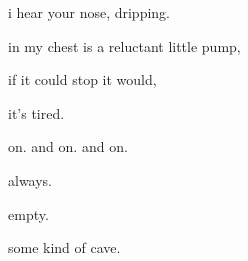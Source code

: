 \documentclass[extrafontsizes, 48pt]{memoir}
\newcommand\blankpage{%
    \null
    \thispagestyle{empty}%
    \addtocounter{page}{-1}%
    \newpage}
\begin{document}
	\begin{minipage}{.6\textwidth}
	i hear your nose, dripping.
	\afterpage{\blankpage}
	\end{minipage}
	\newpage

	\begin{minipage}{.6\textwidth}
	in my chest is a reluctant little pump,
	\end{minipage}
	\newpage

	\begin{minipage}{.6\textwidth}
	if it could stop it would,
	\end{minipage}
	\newpage

	\begin{minipage}{.6\textwidth}
	it's tired.
	\end{minipage}
	\newpage

	\begin{minipage}{.6\textwidth}
	on. and on. and on.
	\end{minipage}
	\newpage

	\begin{minipage}{.6\textwidth}
	always.
	\afterpage{\blankpage}
	\end{minipage}
	\newpage

	\begin{minipage}{.6\textwidth}
	empty.
	\afterpage{\blankpage}
	\end{minipage}
	\newpage

	\begin{minipage}{.6\textwidth}
	some kind of cave.
	\end{minipage}
	\newpage
\end{document}
